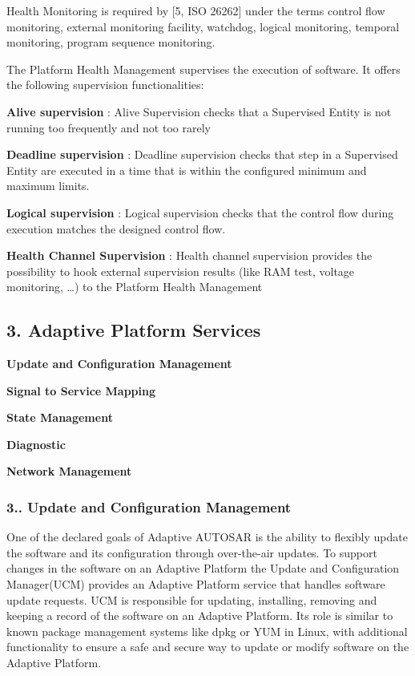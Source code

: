 Health Monitoring is required by \mbox{[}5, I\+SO 26262\mbox{]} under the terms control flow monitoring, external monitoring facility, watchdog, logical monitoring, temporal monitoring, program sequence monitoring.

The Platform Health Management supervises the execution of software. It offers the following supervision functionalities\+:
\begin{DoxyItemize}
\item {\bfseries Alive supervision} \+: Alive Supervision checks that a Supervised Entity is not running too frequently and not too rarely
\item {\bfseries Deadline supervision} \+: Deadline supervision checks that step in a Supervised Entity are executed in a time that is within the configured minimum and maximum limits.
\item {\bfseries Logical supervision} \+: Logical supervision checks that the control flow during execution matches the designed control flow.
\item {\bfseries Health Channel Supervision} \+: Health channel supervision provides the possibility to hook external supervision results (like R\+AM test, voltage monitoring, …) to the Platform Health Management
\end{DoxyItemize}

\subsection*{3. Adaptive Platform Services}


\begin{DoxyItemize}
\item {\bfseries Update and Configuration Management}
\item {\bfseries Signal to Service Mapping}
\item {\bfseries State Management}
\item {\bfseries Diagnostic}
\item {\bfseries Network Management}
\end{DoxyItemize}

\subsubsection*{3.. Update and Configuration Management}

One of the declared goals of Adaptive A\+U\+T\+O\+S\+AR is the ability to flexibly update the software and its configuration through over-\/the-\/air updates. To support changes in the software on an Adaptive Platform the Update and Configuration Manager(\+U\+C\+M) provides an Adaptive Platform service that handles software update requests.  U\+CM is responsible for updating, installing, removing and keeping a record of the software on an Adaptive Platform. Its role is similar to known package management systems like dpkg or Y\+UM in Linux, with additional functionality to ensure a safe and secure way to update or modify software on the Adaptive Platform.

